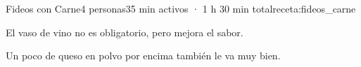 \begin{recetaConImagen}{Fideos con Carne}{4 personas}{35 min activos · 1 h 30 min total}{receta:fideos_carne}
    \vspace{1em}
    \begin{tcolorbox}[colback=orange!5, colframe=orange!50, title=Sugerencia, size=small]
        El vaso de vino no es obligatorio, pero mejora el sabor. 
        
        \vspace{0.5em} %
        Un poco de queso en polvo por encima también le va muy bien. 
    \end{tcolorbox}
\end{recetaConImagen}
